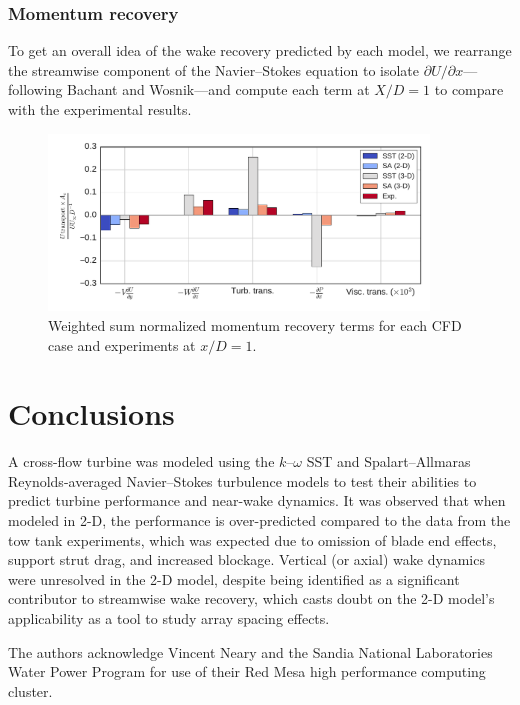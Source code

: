 \documentclass[aip,graphicx]{revtex4-1}
\begin{document}
\subsubsection{Momentum recovery}

To get an overall idea of the wake recovery predicted by each model, we
rearrange the streamwise component of the Navier--Stokes equation to isolate
$\partial U / \partial x$---following Bachant and
Wosnik\cite{Bachant2015-JoT}---and compute each term at $X/D = 1$ to compare
with the experimental results.

\begin{figure}[ht]
    \centering

    \includegraphics[width=0.9\textwidth]{figures/mom_bar_graph}

    \caption{Weighted sum normalized momentum recovery terms for each CFD case
        and experiments\cite{Bachant2015-JoT} at $x/D=1$.}

    \label{fig:recovery}
\end{figure}


\section{Conclusions}

A cross-flow turbine was modeled using the $k$--$\omega$ SST and
Spalart--Allmaras Reynolds-averaged Navier--Stokes turbulence models to test
their abilities to predict turbine performance and near-wake dynamics. It was
observed that when modeled in 2-D, the performance is over-predicted compared to
the data from the tow tank experiments, which was expected due to omission of
blade end effects, support strut drag, and increased blockage. Vertical (or
axial) wake dynamics were unresolved in the 2-D model, despite being identified
as a significant contributor to streamwise wake recovery, which casts doubt on
the 2-D model's applicability as a tool to study array spacing effects.


\begin{acknowledgments}
The authors acknowledge Vincent Neary and the Sandia National Laboratories Water
Power Program for use of their Red Mesa high performance computing cluster.
\end{acknowledgments}


\end{document}
